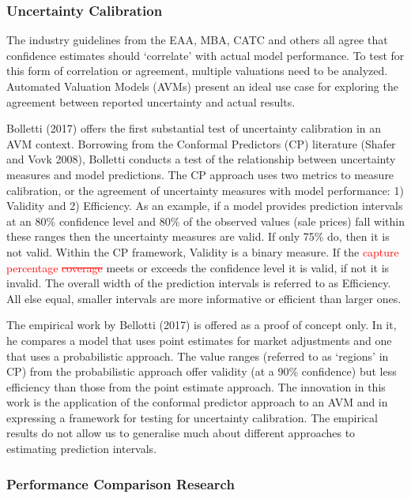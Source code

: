 \documentclass[colTwo]{anon}
\theoremstyle{definition}
\begin{document}
\subsubsection{Uncertainty Calibration}

The industry guidelines from the EAA, MBA, CATC and others all agree that confidence estimates should ‘correlate’ with actual model performance.  To test for this form of correlation or agreement, multiple valuations need to be analyzed.  Automated Valuation Models (AVMs) present an ideal use case for exploring the agreement between reported uncertainty and actual results.  

Bolletti (2017) offers the first substantial test of uncertainty calibration in an AVM context.  Borrowing from the Conformal Predictors (CP) literature (Shafer and Vovk 2008), Bolletti conducts a test of the relationship between uncertainty measures and model predictions. The CP approach uses two metrics to measure calibration, or the agreement of uncertainty measures with model performance: 1) Validity and 2) Efficiency.  As an example, if a model provides prediction intervals at an 80\% confidence level and 80\% of the observed values (sale prices) fall within these ranges then the uncertainty measures are valid. If only 75\% do, then it is not valid. Within the CP framework, Validity is a binary measure.  If the \textcolor{red}{capture percentage \st{coverage}} meets or exceeds the confidence level it is valid, if not it is invalid. The overall width of the prediction intervals is referred to as Efficiency.  All else equal, smaller intervals are more informative or efficient than larger ones. 

The empirical work by Bellotti (2017) is offered as a proof of concept only.  In it, he compares a model that uses point estimates for market adjustments and one that uses a probabilistic approach.  The value ranges (referred to as ‘regions’ in CP) from the probabilistic approach offer validity (at a 90\% confidence) but less efficiency than those from the point estimate approach.  The innovation in this work is the application of the conformal predictor approach to an AVM and in expressing a framework for testing for uncertainty calibration.  The empirical results do not allow us to generalise much about different approaches to estimating prediction intervals.   

\subsubsection{Performance Comparison Research}
\end{document}
